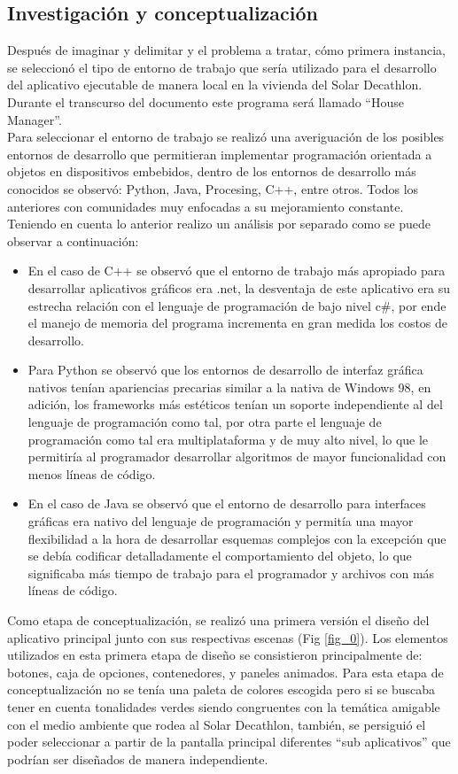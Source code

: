 \subsection{Investigación y conceptualización}
Después de imaginar y delimitar  y el problema a tratar, cómo primera instancia, se seleccionó el tipo de entorno de trabajo que sería utilizado para el desarrollo del aplicativo ejecutable de manera local en la vivienda del Solar Decathlon. Durante el transcurso del documento este programa será llamado ``House Manager''.
\vspace{0.5cm}\\
Para seleccionar el entorno de trabajo se realizó una averiguación de los posibles entornos de desarrollo que permitieran implementar programación orientada a objetos en dispositivos embebidos, dentro de los entornos de desarrollo más conocidos se observó: Python, Java, Procesing, C++, entre otros. Todos los anteriores con comunidades muy enfocadas a su mejoramiento constante. Teniendo en cuenta lo anterior realizo un análisis por separado como se puede observar a continuación:
\begin{itemize}
	\item En el caso de C++ se observó que el entorno de trabajo más apropiado para desarrollar aplicativos gráficos era .net, la desventaja de este aplicativo era su estrecha relación con el lenguaje de programación de bajo nivel c\#, por ende el manejo de memoria del programa incrementa en gran medida los costos de desarrollo.
	\item Para Python se observó que los entornos de desarrollo de interfaz gráfica nativos tenían apariencias precarias similar a la nativa de Windows 98, en adición, los frameworks más estéticos tenían un soporte independiente al del lenguaje de programación como tal, por otra parte el lenguaje de programación como tal era multiplataforma y de muy alto nivel, lo que le permitiría al programador desarrollar algoritmos de mayor funcionalidad con menos líneas de código.
	\item En el caso de Java se observó que el entorno de desarrollo para interfaces gráficas era nativo del lenguaje de programación y permitía una mayor flexibilidad a la hora de desarrollar esquemas complejos con la excepción que se debía codificar detalladamente el comportamiento del objeto, lo que significaba más tiempo de trabajo para el programador y archivos con más líneas de código.
\end{itemize}
Como etapa de conceptualización, se realizó una primera versión el diseño del aplicativo principal junto con sus respectivas escenas (Fig \ref{fig_0}). Los elementos utilizados en esta primera etapa de diseño se consistieron principalmente de: botones, caja de opciones, contenedores, y paneles animados. Para esta etapa de conceptualización no se tenía una paleta de colores escogida pero si se buscaba tener en cuenta tonalidades verdes siendo congruentes con la temática amigable con el medio ambiente que rodea al Solar Decathlon, también, se persiguió el poder seleccionar a partir de la pantalla principal diferentes ``sub aplicativos'' que podrían ser diseñados de manera independiente.

